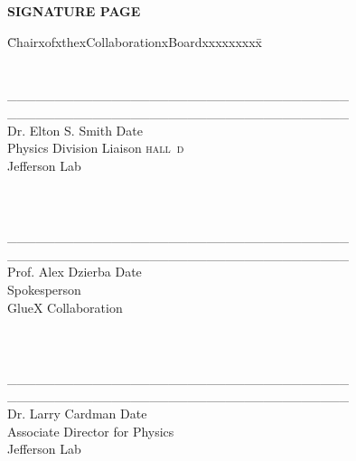 \documentclass[oneside,12pt,letterpaper]{article}
\newcommand{\hd}{\mbox{\textsc{hall d}}}
\newcommand{\gx}{\mbox{GlueX}}
\newcommand{\instname}{Jefferson Lab}
\begin{document}
\clearpage
\begin{center}\textbf{SIGNATURE PAGE}\end{center}
%
%
\begin{tabbing}
\=ChairxofxthexCollaborationxBoardxxxxxxxxx\= \kill
\\
\\
\\
\> \_\_\_\_\_\_\_\_\_\_\_\_\_\_\_\_\_\_\_\_\_\_\_\_\_\_\_\_\_\_\_\_\_\_\_\_ 
\> \_\_\_\_\_\_\_\_\_\_\_\_\_\_\_\_\_\_\_\_\_\_\_\_\_\_\_\_\_\_\_\_\_\_\_\_
\\
\>Dr. Elton S. Smith \> Date \\
\>Physics Division Liaison \hd{} \\
\> \instname{}  \\
\\
\\ 
\\
\> \_\_\_\_\_\_\_\_\_\_\_\_\_\_\_\_\_\_\_\_\_\_\_\_\_\_\_\_\_\_\_\_\_\_\_\_ 
\> \_\_\_\_\_\_\_\_\_\_\_\_\_\_\_\_\_\_\_\_\_\_\_\_\_\_\_\_\_\_\_\_\_\_\_\_ 
\\
\> Prof. Alex Dzierba           \> Date \\
\> Spokesperson                 \\
\> \gx{} Collaboration          \\
\\
\\
\\
\> \_\_\_\_\_\_\_\_\_\_\_\_\_\_\_\_\_\_\_\_\_\_\_\_\_\_\_\_\_\_\_\_\_\_\_\_ 
\> \_\_\_\_\_\_\_\_\_\_\_\_\_\_\_\_\_\_\_\_\_\_\_\_\_\_\_\_\_\_\_\_\_\_\_\_ 
\\
\> Dr. Larry Cardman \> Date \\        
\> Associate Director for Physics \\ 
\> Jefferson Lab \\
%
\end{tabbing}
\end{document}
